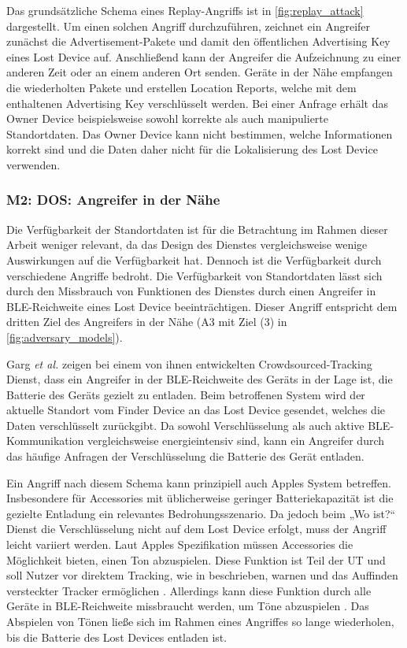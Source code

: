 Das grundsätzliche Schema eines Replay-Angriffs ist in \autoref{fig:replay_attack} dargestellt.
Um einen solchen Angriff durchzuführen, zeichnet ein Angreifer zunächst die Advertisement-Pakete und damit den öffentlichen Advertising Key eines Lost Device auf.
Anschließend kann der Angreifer die Aufzeichnung zu einer anderen Zeit oder an einem anderen Ort senden.
Geräte in der Nähe empfangen die wiederholten Pakete und erstellen Location Reports, welche mit dem enthaltenen Advertising Key verschlüsselt werden.
Bei einer Anfrage erhält das Owner Device beispielsweise sowohl korrekte als auch manipulierte Standortdaten.
Das Owner Device kann nicht bestimmen, welche Informationen korrekt sind und die Daten daher nicht für die Lokalisierung des Lost Device verwenden.

\subsubsection[M2]{M2: \ac{DOS}: Angreifer in der Nähe}
\label{missbrauch:2}
Die Verfügbarkeit der Standortdaten ist für die Betrachtung im Rahmen dieser Arbeit weniger relevant, da das Design des Dienstes vergleichsweise wenige Auswirkungen auf die Verfügbarkeit hat.
Dennoch ist die Verfügbarkeit durch verschiedene Angriffe bedroht.
Die Verfügbarkeit von Standortdaten lässt sich durch den Missbrauch von Funktionen des Dienstes durch einen Angreifer in \ac{BLE}-Reichweite eines Lost Device beeinträchtigen.
Dieser Angriff entspricht dem dritten Ziel des Angreifers in der Nähe (A3 mit Ziel (3) in \autoref{fig:adversary_models}).

Garg \textit{et al.} \cite{Garg_Secure_Tracker} zeigen bei einem von ihnen entwickelten Crowdsourced-Tracking Dienst, dass ein Angreifer in der \ac{BLE}-Reichweite des Geräts in der Lage ist, die Batterie des Geräts gezielt zu entladen.
Beim betroffenen System wird der aktuelle Standort vom Finder Device an das Lost Device gesendet, welches die Daten verschlüsselt zurückgibt.
Da sowohl Verschlüsselung als auch aktive \ac{BLE}-Kommunikation vergleichsweise energieintensiv sind, kann ein Angreifer durch das häufige Anfragen der Verschlüsselung die Batterie des Gerät entladen.

Ein Angriff nach diesem Schema kann prinzipiell auch Apples System betreffen.
Insbesondere für Accessories mit üblicherweise geringer Batteriekapazität ist die gezielte Entladung ein relevantes Bedrohungsszenario.
Da jedoch beim „Wo ist?“ Dienst die Verschlüsselung nicht auf dem Lost Device erfolgt, muss der Angriff leicht variiert werden.
Laut Apples Spezifikation müssen Accessories die Möglichkeit bieten, einen Ton abzuspielen.
Diese Funktion ist Teil der \ac{UT} und soll Nutzer vor direktem Tracking, wie in  beschrieben, warnen und das Auffinden versteckter Tracker ermöglichen \cite{Apple_FindMySpec}.
Allerdings kann diese Funktion durch alle Geräte in \ac{BLE}-Reichweite missbraucht werden, um Töne abzuspielen \cite{Heinrich_AirGuard}.
Das Abspielen von Tönen ließe sich im Rahmen eines Angriffes so lange wiederholen, bis die Batterie des Lost Devices entladen ist.

